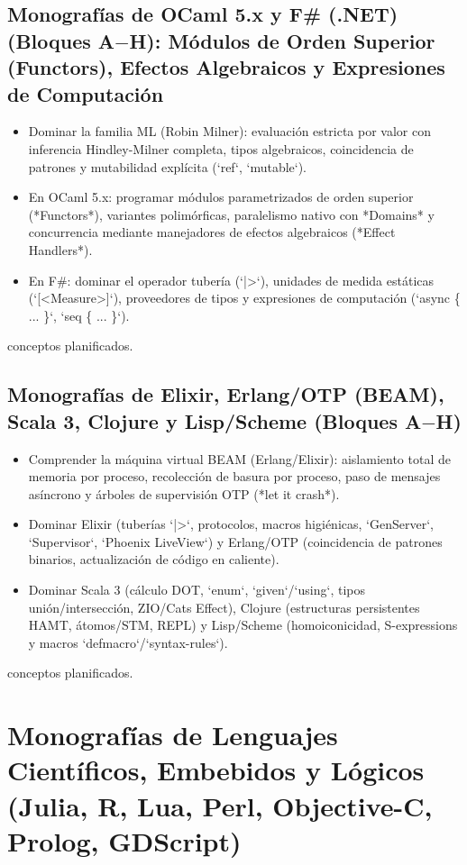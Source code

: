 \documentclass{book}
\begin{document}
\subsection*{\checkmark Monografías de OCaml 5.x y F\# (.NET) (Bloques A\(-\)H): Módulos de Orden Superior (Functors), Efectos Algebraicos y Expresiones de Computación}
\begin{itemize}
\item Dominar la familia ML (Robin Milner): evaluación estricta por valor con inferencia Hindley-Milner completa, tipos algebraicos, coincidencia de patrones y mutabilidad explícita (`ref`, `mutable`).
\item En OCaml 5.x: programar módulos parametrizados de orden superior (*Functors*), variantes polimórficas, paralelismo nativo con *Domains* y concurrencia mediante manejadores de efectos algebraicos (*Effect Handlers*).
\item En F\#: dominar el operador tubería (`|>`), unidades de medida estáticas (`[<Measure>]`), proveedores de tipos y expresiones de computación (`async \{ ... \}`, `seq \{ ... \}`).
\end{itemize}
 conceptos planificados.

\subsection*{\checkmark Monografías de Elixir, Erlang/OTP (BEAM), Scala 3, Clojure y Lisp/Scheme (Bloques A\(-\)H)}
\begin{itemize}
\item Comprender la máquina virtual BEAM (Erlang/Elixir): aislamiento total de memoria por proceso, recolección de basura por proceso, paso de mensajes asíncrono y árboles de supervisión OTP (*let it crash*).
\item Dominar Elixir (tuberías `|>`, protocolos, macros higiénicas, `GenServer`, `Supervisor`, `Phoenix LiveView`) y Erlang/OTP (coincidencia de patrones binarios, actualización de código en caliente).
\item Dominar Scala 3 (cálculo DOT, `enum`, `given`/`using`, tipos unión/intersección, ZIO/Cats Effect), Clojure (estructuras persistentes HAMT, átomos/STM, REPL) y Lisp/Scheme (homoiconicidad, S-expressions y macros `defmacro`/`syntax-rules`).
\end{itemize}
 conceptos planificados.

\section*{Monografías de Lenguajes Científicos, Embebidos y Lógicos (Julia, R, Lua, Perl, Objective-C, Prolog, GDScript)}
\end{document}
